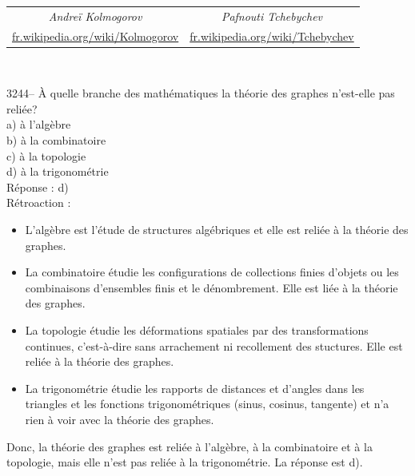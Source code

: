 \documentclass[letterpaper, 12pt]{article}
\begin{document}
\begin{center}
\begin{tabular}{c c}
\emph{{\small Andre\"i Kolmogorov}} & \emph{{\small Pafnouti Tchebychev}}\\
\href{http://fr.wikipedia.org/wiki/Kolmogorov}{fr.wikipedia.org/wiki/Kolmogorov} & \href{http://fr.wikipedia.org/wiki/Tchebychev}{fr.wikipedia.org/wiki/Tchebychev}\\
\end{tabular}\\
\end{center}



3244-- \`A quelle branche des math\'ematiques la th\'eorie des graphes n'est-elle pas reli\'ee?\\

a) \`a l'alg\`ebre\\
b) \`a la combinatoire\\
c) \`a la topologie\\
d) \`a la trigonom\'etrie\\

R\'eponse : d)\\

R\'etroaction :\\
\begin{itemize}
\item L'alg\`ebre est l'\'etude de structures alg\'ebriques et elle est reli\'ee \`a la th\'eorie des graphes.
\item La combinatoire \'etudie les configurations de collections finies d'objets ou les combinaisons d'ensembles finis et le d\'enombrement. Elle est li\'ee \`a la th\'eorie des graphes.
\item La topologie \'etudie les d\'eformations spatiales par des transformations continues, c'est-\`a-dire sans arrachement ni recollement des stuctures. Elle est reli\'ee \`a la th\'eorie des graphes.
\item La trigonom\'etrie \'etudie les rapports de distances et d'angles dans les triangles et les fonctions trigonom\'etriques (sinus, cosinus, tangente) et n'a rien \`a voir avec la th\'eorie des graphes.\\
\end{itemize}
Donc, la th\'eorie des graphes est reli\'ee \`a l'alg\`ebre, \`a la combinatoire et \`a la topologie, mais elle n'est pas reli\'ee \`a la trigonom\'etrie. La r\'eponse est d).\\
\end{document}
